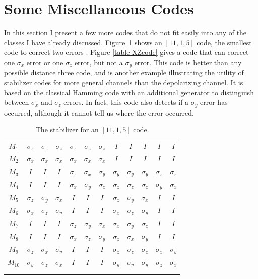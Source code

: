 \documentclass{report}
\newcommand{\X}{\sigma_x}
\newcommand{\Z}{\sigma_z}
\newcommand{\Y}{\sigma_y}
\newcommand{\Xbar}{\overline{X}}
\newcommand{\Zbar}{\overline{Z}}
\newcommand{\low}[1]{\raisebox{-0.3ex}{{#1}}}
\begin{document}
\section{Some Miscellaneous Codes}

In this section I present a few more codes that do not fit easily
into any of the classes I have already discussed.  Figure~\ref{table-11qubit}
shows an $[11,1,5]$ code, the smallest code to correct two errors
\cite{calderbank-GF4}.  Figure \ref{table-XZcode} gives a code that can 
correct one $\X$ error or one $\Z$ error, but not a $\Y$ error.  This code is 
better than any possible distance three code, and is another example 
illustrating the utility of stabilizer codes for more general channels than the 
depolarizing channel.  It is based on the classical Hamming code with an 
additional generator to distinguish between $\X$ and $\Z$ errors.  In fact, 
this code also detects if a $\Y$ error has occurred, although it cannot tell us 
where the error occurred.

\begin{table}
\centering
\begin{tabular}{c|ccccccccccc}
$M_1$ & $\Z$ & $\Z$ & $\Z$ & $\Z$ & $\Z$ & $\Z$ & $I$ & $I$ & $I$ & $I$ & $I$ 
\\
$M_2$ & $\X$ & $\X$ & $\X$ & $\X$ & $\X$ & $\X$ & $I$ & $I$ & $I$ & $I$ & $I$ 
\\
$M_3$ & $I$ & $I$ & $I$ & $\Z$ & $\X$ & $\Y$ & $\Y$ & $\Y$ & $\Y$ & $\X$ & $\Z$
\\
$M_4$ & $I$ & $I$ & $I$ & $\X$ & $\Y$ & $\Z$ & $\Z$ & $\Z$ & $\Z$ & $\Y$ & $\X$
\\
$M_5$ & $\Z$ & $\Y$ & $\X$ & $I$ & $I$ & $I$ & $\Z$ & $\Y$ & $\X$ & $I$ & $I$ 
\\
$M_6$ & $\X$ & $\Z$ & $\Y$ & $I$ & $I$ & $I$ & $\X$ & $\Z$ & $\Y$ & $I$ & $I$ 
\\
$M_7$ & $I$ & $I$ & $I$ & $\Z$ & $\Y$ & $\X$ & $\X$ & $\Y$ & $\Z$ & $I$ & $I$
\\
$M_8$ & $I$ & $I$ & $I$ & $\X$ & $\Z$ & $\Y$ & $\Z$ & $\X$ & $\Y$ & $I$ & $I$ 
\\
$M_9$ & $\Z$ & $\X$ & $\Y$ & $I$ & $I$ & $I$ & $\Z$ & $\Z$ & $\Z$ & $\X$ & $\Y$
\\
$M_{10}$ & $\Y$ & $\Z$ & $\X$ & $I$ & $I$ & $I$ & $\Y$ & $\Y$ & $\Y$ & $\Z$ & 
$\X$ \\
\hline
\low{$\Xbar$} & \low{$I$} & \low{$I$} & \low{$I$} & \low{$I$} & \low{$I$} & 
\low{$I$} & \low{$\X$} & \low{$\X$} & \low{$\X$} & \low{$\X$} & \low{$\X$} \\
\low{$\Zbar$} & \low{$I$} & \low{$I$} & \low{$I$} & \low{$I$} & \low{$I$} & 
\low{$I$} & \low{$\Z$} & \low{$\Z$} & \low{$\Z$} & \low{$\Z$} & \low{$\Z$} 
\end{tabular}
\caption{The stabilizer for an $[11,1,5]$ code.}
\label{table-11qubit}
\end{table}
\end{document}
